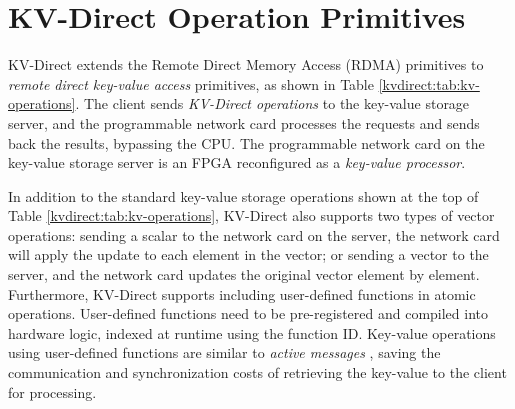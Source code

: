 \section{KV-Direct Operation Primitives}
\label{kvdirect:sec:architecture}
\label{kvdirect:sec:kv-operations}

KV-Direct extends the Remote Direct Memory Access (RDMA) primitives to \textit{remote direct key-value access} primitives, as shown in Table \ref{kvdirect:tab:kv-operations}.
The client sends \textit{KV-Direct operations} to the key-value storage server, and the programmable network card processes the requests and sends back the results, bypassing the CPU.
The programmable network card on the key-value storage server is an FPGA reconfigured as a \textit{key-value processor}.

In addition to the standard key-value storage operations shown at the top of Table \ref{kvdirect:tab:kv-operations}, KV-Direct also supports two types of vector operations:
sending a scalar to the network card on the server, the network card will apply the update to each element in the vector; or sending a vector to the server, and the network card updates the original vector element by element.
Furthermore, KV-Direct supports including user-defined functions in atomic operations.
User-defined functions need to be pre-registered and compiled into hardware logic, indexed at runtime using the function ID.
Key-value operations using user-defined functions are similar to \textit{active messages} \cite{eicken1992active}, saving the communication and synchronization costs of retrieving the key-value to the client for processing.

